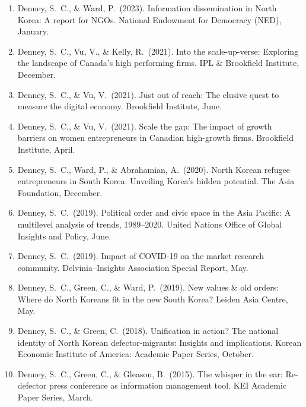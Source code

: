 \documentclass[11pt, a4paper]{article}
\begin{document}
\begin{enumerate}[itemsep=0.15em]
  \item Denney, S.\ C., \& Ward, P.\ (2023). Information dissemination in North Korea: A report for NGOs. National Endowment for Democracy (NED), January.

  \item Denney, S.\ C., Vu, V., \& Kelly, R.\ (2021). Into the scale-up-verse: Exploring the landscape of Canada's high performing firms. IPL \& Brookfield Institute, December.

  \item Denney, S.\ C., \& Vu, V.\ (2021). Just out of reach: The elusive quest to measure the digital economy. Brookfield Institute, June.

  \item Denney, S.\ C., \& Vu, V.\ (2021). Scale the gap: The impact of growth barriers on women entrepreneurs in Canadian high-growth firms. Brookfield Institute, April.

  \item Denney, S.\ C., Ward, P., \& Abrahamian, A.\ (2020). North Korean refugee entrepreneurs in South Korea: Unveiling Korea's hidden potential. The Asia Foundation, December.

  \item Denney, S.\ C.\ (2019). Political order and civic space in the Asia Pacific: A multilevel analysis of trends, 1989--2020. United Nations Office of Global Insights and Policy, June.

  \item Denney, S.\ C.\ (2019). Impact of COVID-19 on the market research community. Delvinia--Insights Association Special Report, May.

  \item Denney, S.\ C., Green, C., \& Ward, P.\ (2019). New values \& old orders: Where do North Koreans fit in the new South Korea? Leiden Asia Centre, May.

  \item Denney, S.\ C., \& Green, C.\ (2018). Unification in action? The national identity of North Korean defector-migrants: Insights and implications. Korean Economic Institute of America: Academic Paper Series, October.

  \item Denney, S.\ C., Green, C., \& Gleason, B.\ (2015). The whisper in the ear: Re-defector press conference as information management tool. KEI Academic Paper Series, March.
\end{enumerate}
\end{document}
